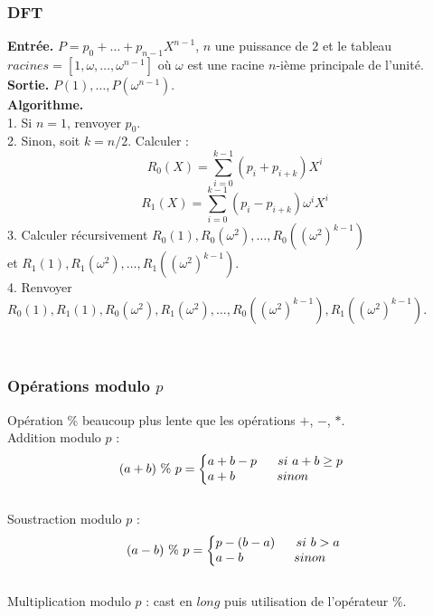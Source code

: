 \documentclass[8pt]{beamer}
\begin{document}
\begin{frame}
\frametitle{DFT}

\begin{tcolorbox}[colback=cyan!5!white,
                  colframe=cyan!100!black,
                  title=\textbf{Algorithme DFT}
                 ]
\textbf{Entrée.} $P = p_0+\dots+p_{n-1}X^{n-1}$, $n$ une puissance de $2$ et le tableau $ racines = [1, \omega,\dots,\omega^{n-1}]$ où $\omega$ est une racine $n$-ième principale de l'unité.\\[0.1cm]
\textbf{Sortie.} $P(1),\dots,P(\omega^{n-1})$.\\[0.1cm]
\textbf{Algorithme.} \\[0.1cm]
1. \textit{}Si $n=1$, renvoyer $p_0$. \\ [0.1cm]
2. \textit{}Sinon, soit $k=n/2$. Calculer :\\
\[ R_0(X) = \sum_{i=0}^{k-1}(p_i+p_{i+k})X^i \]
\[ R_1(X) = \sum_{i=0}^{k-1}(p_i-p_{i+k})\omega^iX^i \]
3. \textit{}Calculer récursivement $R_0(1), R_0(\omega^2),\dots,R_0((\omega^2)^{k-1})$ \\ [0.1cm]
et $R_1(1), R_1(\omega^2),\dots,R_1((\omega^2)^{k-1})$. \\[0.2cm]
4. \textit{}Renvoyer $R_0(1), R_1(1), R_0(\omega^2), R_1(\omega^2),\dots, R_0((\omega^2)^{k-1}), R_1((\omega^2)^{k-1})$.
\end{tcolorbox}
\ \\

\end{frame}

\begin{frame}
\frametitle{Opérations modulo $p$}

Opération \% beaucoup plus lente que les opérations $+$, $-$, $*$. \\[0.5cm]
Addition modulo $p$ :
\[ (a+b)\ \%\ p = 
\left\{\begin{array}{@{}l@{}}
a + b - p\ \ \ \ \ si\ a+b \geq p\\
a + b\ \ \ \ \ \ \ \ \ \ sinon
\end{array}\right.\,\ \] \\
Soustraction modulo $p$ :
\[ (a-b)\ \%\ p = 
\left\{\begin{array}{@{}l@{}}
p - (b - a)\ \ \ \ \ si\ b > a\\
a - b\ \ \ \ \ \ \ \ \ \ \ \ sinon
\end{array}\right.\,\]\\[0.2cm]

Multiplication modulo $p$ : cast en $long$ puis utilisation de l'opérateur \%.

\end{frame}
\end{document}
